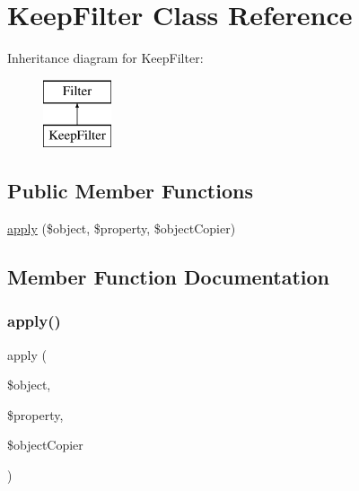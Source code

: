 \hypertarget{class_deep_copy_1_1_filter_1_1_keep_filter}{}\section{Keep\+Filter Class Reference}
\label{class_deep_copy_1_1_filter_1_1_keep_filter}
Inheritance diagram for Keep\+Filter\+:\begin{figure}[H]
\begin{center}
\leavevmode
\includegraphics[height=2.000000cm]{class_deep_copy_1_1_filter_1_1_keep_filter}
\end{center}
\end{figure}
\subsection*{Public Member Functions}
\begin{DoxyCompactItemize}
\item 
\mbox{\hyperlink{class_deep_copy_1_1_filter_1_1_keep_filter_a360932fe7f9488472623d76aa7da2a25}{apply}} (\$object, \$property, \$object\+Copier)
\end{DoxyCompactItemize}


\subsection{Member Function Documentation}
\mbox{\label{class_deep_copy_1_1_filter_1_1_keep_filter_a360932fe7f9488472623d76aa7da2a25}} 
\subsubsection{\texorpdfstring{apply()}{apply()}}
{\footnotesize\ttfamily apply (\begin{DoxyParamCaption}\item[{}]{\$object,  }\item[{}]{\$property,  }\item[{}]{\$object\+Copier }\end{DoxyParamCaption})}

